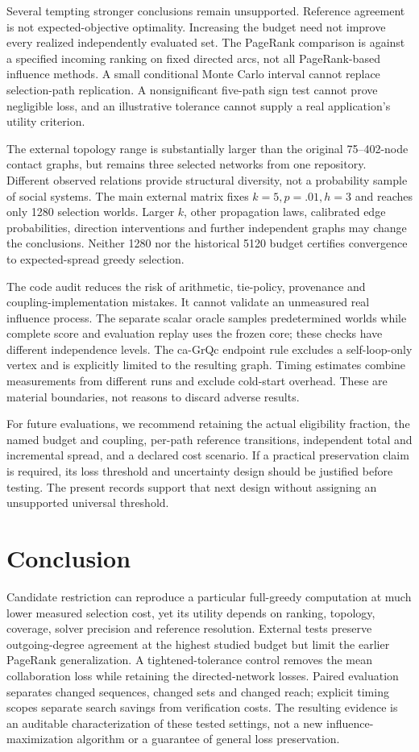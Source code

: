 \documentclass[smallextended]{svjour3}
\begin{document}
Several tempting stronger conclusions remain unsupported. Reference agreement is not expected-objective optimality. Increasing the budget need not improve every realized independently evaluated set. The PageRank comparison is against a specified incoming ranking on fixed directed arcs, not all PageRank-based influence methods. A small conditional Monte Carlo interval cannot replace selection-path replication. A nonsignificant five-path sign test cannot prove negligible loss, and an illustrative tolerance cannot supply a real application's utility criterion.

The external topology range is substantially larger than the original 75--402-node contact graphs, but remains three selected networks from one repository. Different observed relations provide structural diversity, not a probability sample of social systems. The main external matrix fixes $k=5,p=.01,h=3$ and reaches only 1280 selection worlds. Larger $k$, other propagation laws, calibrated edge probabilities, direction interventions and further independent graphs may change the conclusions. Neither 1280 nor the historical 5120 budget certifies convergence to expected-spread greedy selection.

The code audit reduces the risk of arithmetic, tie-policy, provenance and coupling-implementation mistakes. It cannot validate an unmeasured real influence process. The separate scalar oracle samples predetermined worlds while complete score and evaluation replay uses the frozen core; these checks have different independence levels. The ca-GrQc endpoint rule excludes a self-loop-only vertex and is explicitly limited to the resulting graph. Timing estimates combine measurements from different runs and exclude cold-start overhead. These are material boundaries, not reasons to discard adverse results.

For future evaluations, we recommend retaining the actual eligibility fraction, the named budget and coupling, per-path reference transitions, independent total and incremental spread, and a declared cost scenario. If a practical preservation claim is required, its loss threshold and uncertainty design should be justified before testing. The present records support that next design without assigning an unsupported universal threshold.

\section{Conclusion}
Candidate restriction can reproduce a particular full-greedy computation at much lower measured selection cost, yet its utility depends on ranking, topology, coverage, solver precision and reference resolution. External tests preserve outgoing-degree agreement at the highest studied budget but limit the earlier PageRank generalization. A tightened-tolerance control removes the mean collaboration loss while retaining the directed-network losses. Paired evaluation separates changed sequences, changed sets and changed reach; explicit timing scopes separate search savings from verification costs. The resulting evidence is an auditable characterization of these tested settings, not a new influence-maximization algorithm or a guarantee of general loss preservation.
\end{document}
